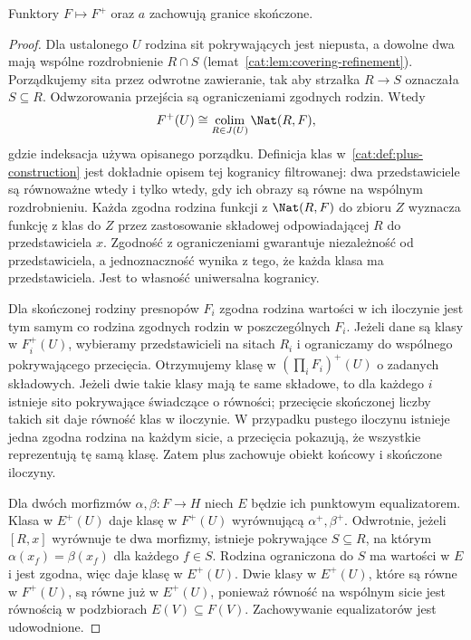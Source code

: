 \begin{twierdzenie}\label{cat:thm:sheafification-left-exact}
Funktory $F\mapsto F^+$ oraz $a$ zachowują granice skończone.
\end{twierdzenie}
\begin{proof}
Dla ustalonego $U$ rodzina sit pokrywających jest niepusta, a dowolne dwa mają wspólne rozdrobnienie $R\cap S$ (lemat~\ref{cat:lem:covering-refinement}). Porządkujemy sita przez odwrotne zawieranie, tak aby strzałka $R\to S$ oznaczała $S\subseteq R$. Odwzorowania przejścia są ograniczeniami zgodnych rodzin. Wtedy
\[
 F^+(U)\cong\operatorname*{colim}_{R\in J(U)}\Nat(R,F),
\]
gdzie indeksacja używa opisanego porządku. Definicja klas w~\ref{cat:def:plus-construction} jest dokładnie opisem tej kogranicy filtrowanej: dwa przedstawiciele są równoważne wtedy i tylko wtedy, gdy ich obrazy są równe na wspólnym rozdrobnieniu. Każda zgodna rodzina funkcji z $\Nat(R,F)$ do zbioru $Z$ wyznacza funkcję z klas do $Z$ przez zastosowanie składowej odpowiadającej $R$ do przedstawiciela $x$. Zgodność z ograniczeniami gwarantuje niezależność od przedstawiciela, a jednoznaczność wynika z tego, że każda klasa ma przedstawiciela. Jest to własność uniwersalna kogranicy.

Dla skończonej rodziny presnopów $F_i$ zgodna rodzina wartości w ich iloczynie jest tym samym co rodzina zgodnych rodzin w poszczególnych $F_i$. Jeżeli dane są klasy w $F_i^+(U)$, wybieramy przedstawicieli na sitach $R_i$ i ograniczamy do wspólnego pokrywającego przecięcia. Otrzymujemy klasę w $(\prod_i F_i)^+(U)$ o zadanych składowych. Jeżeli dwie takie klasy mają te same składowe, to dla każdego $i$ istnieje sito pokrywające świadczące o równości; przecięcie skończonej liczby takich sit daje równość klas w iloczynie. W przypadku pustego iloczynu istnieje jedna zgodna rodzina na każdym sicie, a przecięcia pokazują, że wszystkie reprezentują tę samą klasę. Zatem plus zachowuje obiekt końcowy i skończone iloczyny.

Dla dwóch morfizmów $\alpha,\beta:F\to H$ niech $E$ będzie ich punktowym equalizatorem. Klasa w $E^+(U)$ daje klasę w $F^+(U)$ wyrównującą $\alpha^+,\beta^+$. Odwrotnie, jeżeli $[R,x]$ wyrównuje te dwa morfizmy, istnieje pokrywające $S\subseteq R$, na którym $\alpha(x_f)=\beta(x_f)$ dla każdego $f\in S$. Rodzina ograniczona do $S$ ma wartości w $E$ i jest zgodna, więc daje klasę w $E^+(U)$. Dwie klasy w $E^+(U)$, które są równe w $F^+(U)$, są równe już w $E^+(U)$, ponieważ równość na wspólnym sicie jest równością w podzbiorach $E(V)\subseteq F(V)$. Zachowywanie equalizatorów jest udowodnione.


\end{proof}
